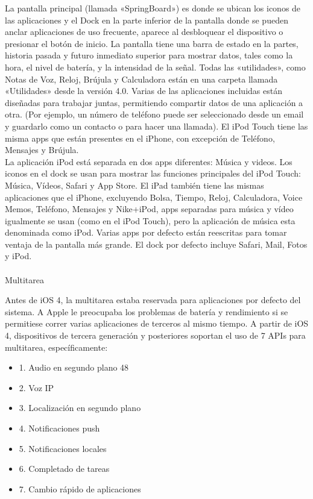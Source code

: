 	La pantalla principal (llamada «SpringBoard») es donde se ubican los iconos de las aplicaciones y el Dock en la parte inferior de la pantalla donde se pueden anclar aplicaciones de uso frecuente, aparece al desbloquear el dispositivo o presionar el botón de inicio. La pantalla tiene una barra de estado en la partes, historia pasada y futuro inmediato superior para mostrar datos, tales como la hora, el nivel de batería, y la intensidad de la señal. Todas las «utilidades», como Notas de Voz, Reloj, Brújula y Calculadora están en una carpeta llamada «Utilidades» desde la versión 4.0. Varias de las aplicaciones incluidas están diseñadas para trabajar juntas, permitiendo compartir datos de una aplicación a otra. (Por ejemplo, un número de teléfono puede ser seleccionado desde un email y guardarlo como un contacto o para hacer una llamada). El iPod Touch tiene las misma apps que están presentes en el iPhone, con excepción de Teléfono, Mensajes y Brújula.\\ 
	
	La aplicación iPod está separada en dos apps diferentes: Música y videos. Los iconos en el dock se usan para mostrar las funciones principales del iPod Touch: Música, Vídeos, Safari y App Store. El iPad también tiene las mismas aplicaciones que el iPhone, excluyendo Bolsa, Tiempo, Reloj, Calculadora, Voice Memos, Teléfono, Mensajes y Nike+iPod, apps separadas para música y vídeo igualmente se usan (como en el iPod Touch), pero la aplicación de música esta denominada como iPod. Varias apps por defecto están reescritas para tomar ventaja de la pantalla más grande. El dock por defecto incluye Safari, Mail, Fotos y iPod.\\ \\
	Multitarea 
	
	Antes de iOS 4, la multitarea estaba reservada para aplicaciones por defecto del sistema. A Apple le preocupaba los problemas de batería y rendimiento si se permitiese correr varias aplicaciones de terceros al mismo tiempo. A partir de iOS 4, dispositivos de tercera generación y posteriores soportan el uso de 7 APIs para multitarea, específicamente: \begin{itemize}
		\item 1. Audio en segundo plano 48
		\item 2. Voz IP
		\item 3. Localización en segundo plano
		\item 4. Notificaciones push
		\item 5. Notificaciones locales
		\item 6. Completado de tareas
		\item 7. Cambio rápido de aplicaciones
	\end{itemize}
	 \cite{14}
	
